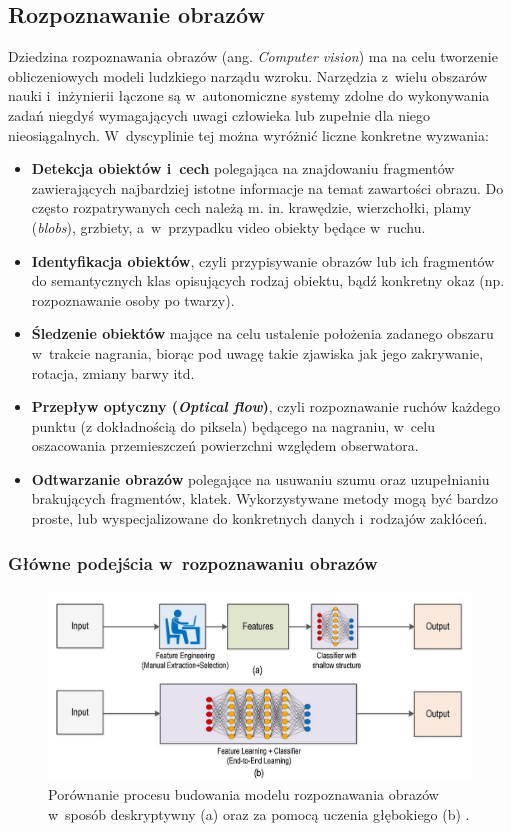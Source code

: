\subsection{Rozpoznawanie obrazów}
    Dziedzina rozpoznawania obrazów (ang. \emph{Computer vision}) ma na celu tworzenie obliczeniowych modeli ludzkiego narządu wzroku. Narzędzia z~wielu obszarów nauki i~inżynierii łączone są w~autonomiczne systemy zdolne do wykonywania zadań niegdyś wymagających uwagi człowieka lub zupełnie dla niego nieosiągalnych. W~dyscyplinie tej można wyróżnić liczne konkretne wyzwania:
\begin{itemize}
    \item \textbf{Detekcja obiektów i~cech} polegająca na znajdowaniu fragmentów zawierających najbardziej istotne informacje na temat zawartości obrazu. Do często rozpatrywanych cech należą m. in. krawędzie, wierzchołki, plamy (\emph{blobs}), grzbiety, a~w~przypadku video obiekty będące w~ruchu.
    \item \textbf{Identyfikacja obiektów}, czyli przypisywanie obrazów lub ich fragmentów do semantycznych klas opisujących rodzaj obiektu, bądź konkretny okaz (np. rozpoznawanie osoby po twarzy).
    \item \textbf{Śledzenie obiektów} mające na celu ustalenie położenia zadanego obszaru w~trakcie nagrania, biorąc pod uwagę takie zjawiska jak jego zakrywanie, rotacja, zmiany barwy itd. 
    \item \textbf{Przepływ optyczny (\emph{Optical flow})}, czyli rozpoznawanie ruchów każdego punktu (z dokładnością do piksela) będącego na nagraniu, w~celu oszacowania przemieszczeń powierzchni względem obserwatora.
    \item \textbf{Odtwarzanie obrazów} polegające na usuwaniu szumu oraz uzupełnianiu brakujących fragmentów, klatek. Wykorzystywane metody mogą być bardzo proste, lub wyspecjalizowane do konkretnych danych i~rodzajów zakłóceń. \cite{Szeliski2011}
\end{itemize}

\subsubsection{Główne podejścia w~rozpoznawaniu obrazów}

\begin{figure}[ht!]
\centering\includegraphics[width=115mm]{figures/dl_v_traditional.png}
\caption{Porównanie procesu budowania modelu rozpoznawania obrazów w~sposób deskryptywny (a) oraz za pomocą uczenia głębokiego (b) \cite{walsh19}.}
\label{fig:walsh19}
\end{figure}

